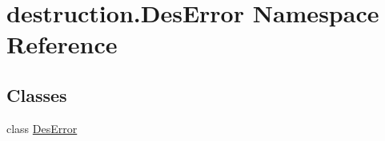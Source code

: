 \hypertarget{namespacedestruction_1_1_des_error}{\section{destruction.\-Des\-Error Namespace Reference}
\label{namespacedestruction_1_1_des_error}
}
\subsection*{Classes}
\begin{DoxyCompactItemize}
\item 
class \hyperlink{classdestruction_1_1_des_error_1_1_des_error}{Des\-Error}
\end{DoxyCompactItemize}
